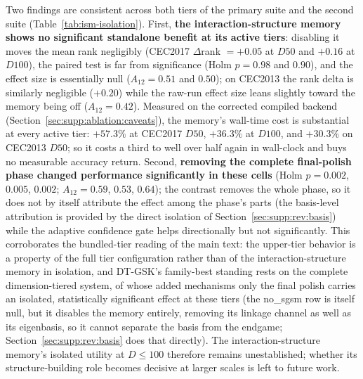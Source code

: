 \documentclass[algorithms,article,submit,moreauthors,pdftex]{Definitions/mdpi}
\newcommand{\dtgsk}{DT-GSK}
\begin{document}
Two findings are consistent across both tiers of the primary suite and the
second suite (Table~\ref{tab:ism-isolation}).  First, \textbf{the
interaction-structure memory shows no
significant standalone benefit at its active tiers}: disabling it moves the mean
rank negligibly (CEC2017 $\Delta$rank $= +0.05$ at $D50$ and $+0.16$ at $D100$),
the paired test is far from significance (Holm $p = 0.98$ and $0.90$), and the
effect size is essentially null ($A_{12} = 0.51$ and $0.50$); on CEC2013 the
rank delta is similarly negligible ($+0.20$) while the raw-run effect size
leans slightly toward the memory being off ($A_{12} = 0.42$).  Measured on the
corrected compiled backend (Section~\ref{sec:supp:ablation:caveats}), the
memory's wall-time cost is substantial at every active tier:
$\mathbf{{+}57.3\%}$ at CEC2017 $D50$, $\mathbf{{+}36.3\%}$ at $D100$, and
$+30.3\%$ on CEC2013 $D50$; so it costs a third to well over half again in
wall-clock and buys no measurable accuracy return.  Second,
\textbf{removing the complete final-polish phase changed performance
significantly in these cells} (Holm $p = 0.002$, $0.005$, $0.002$;
$A_{12} = 0.59$, $0.53$, $0.64$); the contrast removes the whole phase, so it
does not by itself attribute the effect among the phase's parts (the
basis-level attribution is provided by the direct isolation of
Section~\ref{sec:supp:rev:basis}) while the adaptive confidence gate helps directionally but not
significantly.  This corroborates the bundled-tier reading of the main text: the
upper-tier behavior is a property of the full tier configuration rather
than of the interaction-structure memory in isolation, and \dtgsk{}'s
family-best standing rests on the complete dimension-tiered system, of whose
added mechanisms only the final polish carries an isolated, statistically
significant effect at these tiers (the no\_sgsm row is itself null, but it
disables the memory entirely, removing its linkage channel as well as its
eigenbasis, so it cannot separate the basis from the endgame;
Section~\ref{sec:supp:rev:basis} does that directly).  The interaction-structure memory's isolated
utility at $D \le 100$ therefore remains unestablished; whether its
structure-building role becomes decisive at larger scales is left to future work.
\end{document}
